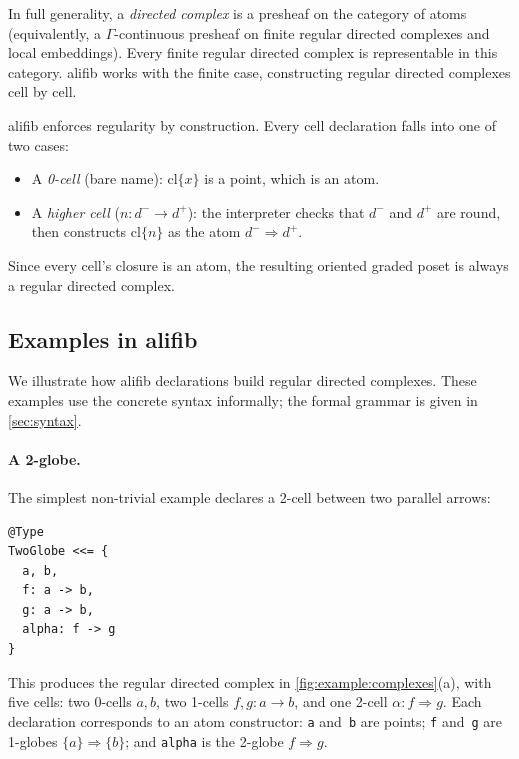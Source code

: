 \documentclass[acmsmall,screen,nonacm]{acmart}
\begin{document}
In full generality, a \emph{directed complex} is a presheaf on the
category of atoms (equivalently, a $\Gamma$-continuous presheaf on
finite regular directed complexes and local embeddings).  Every finite
regular directed complex is representable in this category.
\textsf{alifib} works with the finite case, constructing regular
directed complexes cell by cell.

\textsf{alifib} enforces regularity by construction.  Every cell
declaration falls into one of two cases:
\begin{itemize}
  \item A \emph{0-cell} (bare name): $\mathrm{cl}\{x\}$ is a point,
    which is an atom.
  \item A \emph{higher cell} ($n : d^- \to d^+$): the interpreter
    checks that $d^-$ and $d^+$ are round, then constructs
    $\mathrm{cl}\{n\}$ as the atom $d^- \Rightarrow d^+$.
\end{itemize}
Since every cell's closure is an atom, the resulting oriented graded
poset is always a regular directed complex.

\subsection{Examples in \textsf{alifib}}
\label{sec:molecules:examples}

We illustrate how \textsf{alifib} declarations build regular directed
complexes.  These examples use the concrete syntax informally; the
formal grammar is given in \cref{sec:syntax}.

\paragraph{A 2-globe.}
The simplest non-trivial example declares a 2-cell between two
parallel arrows:
\begin{verbatim}
@Type
TwoGlobe <<= {
  a, b,
  f: a -> b,
  g: a -> b,
  alpha: f -> g
}
\end{verbatim}
This produces the regular directed complex in
\cref{fig:example:complexes}(a), with five cells: two 0-cells $a, b$,
two 1-cells $f, g : a \to b$, and one 2-cell
$\alpha : f \Rightarrow g$.  Each declaration corresponds to an atom
constructor: \texttt{a} and~\texttt{b} are points;
\texttt{f} and~\texttt{g} are 1-globes $\{a\} \Rightarrow \{b\}$;
and \texttt{alpha} is the 2-globe $f \Rightarrow g$.
\end{document}
